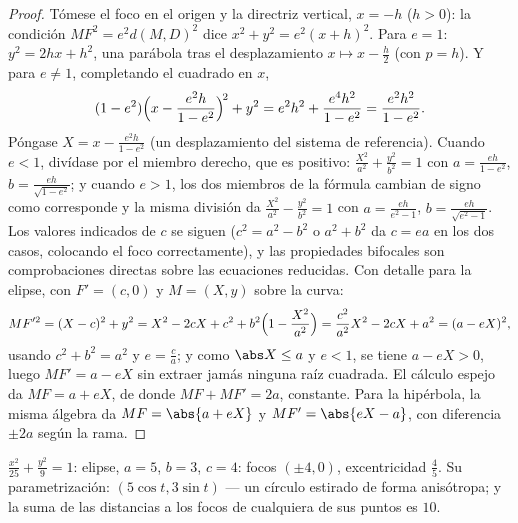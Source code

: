 \begin{proof}
Tómese el foco en el origen y la directriz vertical, $x = -h$
($h > 0$): la condición $MF^2 = e^2 d(M, D)^2$ dice
$x^2 + y^2 = e^2 (x + h)^2$. Para $e = 1$: $y^2 = 2hx + h^2$, una
parábola tras el desplazamiento $x \mapsto x - \frac h2$ (con
$p = h$). Y para $e \neq 1$, completando el cuadrado en $x$,
\[
(1 - e^2)\Bigl(x - \frac{e^2 h}{1 - e^2}\Bigr)^{\!2} + y^2
= e^2h^2 + \frac{e^4 h^2}{1 - e^2}
= \frac{e^2 h^2}{1 - e^2} .
\]
Póngase $X = x - \frac{e^2h}{1-e^2}$ (un desplazamiento del sistema
de referencia). Cuando $e < 1$, divídase por el miembro derecho, que
es positivo: $\frac{X^2}{a^2} + \frac{y^2}{b^2} = 1$ con
$a = \frac{eh}{1 - e^2}$, $b = \frac{eh}{\sqrt{1-e^2}}$; y cuando
$e > 1$, los dos miembros de la fórmula cambian de signo como
corresponde y la misma división da
$\frac{X^2}{a^2} - \frac{y^2}{b^2} = 1$ con
$a = \frac{eh}{e^2 - 1}$, $b = \frac{eh}{\sqrt{e^2 - 1}}$. Los
valores indicados de $c$ se siguen ($c^2 = a^2 - b^2$ o $a^2 + b^2$
da $c = ea$ en los dos casos, colocando el foco correctamente), y las
propiedades bifocales son comprobaciones directas sobre las
ecuaciones reducidas. Con detalle para la elipse, con $F' = (c, 0)$ y
$M = (X, y)$ sobre la curva:
\[
MF'^2 = (X - c)^2 + y^2
= X^2 - 2cX + c^2 + b^2\Bigl(1 - \frac{X^2}{a^2}\Bigr)
= \frac{c^2}{a^2}X^2 - 2cX + a^2
= (a - eX)^2 ,
\]
usando $c^2 + b^2 = a^2$ y $e = \frac ca$; y como $\abs X \leq a$ y
$e < 1$, se tiene $a - eX > 0$, luego $MF' = a - eX$ sin extraer
jamás ninguna raíz cuadrada. El cálculo espejo da $MF = a + eX$, de
donde $MF + MF' = 2a$, constante. Para la hipérbola, la misma álgebra
da $MF = \abs{a + eX}$ y $MF' = \abs{eX - a}$, con diferencia
$\pm2a$ según la rama.
\end{proof}

\begin{example}\label{ex:b1:curves:conicexample}
$\frac{x^2}{25} + \frac{y^2}{9} = 1$: elipse, $a = 5$, $b = 3$,
$c = 4$: focos $(\pm4, 0)$, excentricidad $\frac45$. Su
parametrización: $(5\cos t, 3\sin t)$ --- un círculo estirado de
forma anisótropa; y la suma de las distancias a los focos de
cualquiera de sus puntos es $10$.
\end{example}

